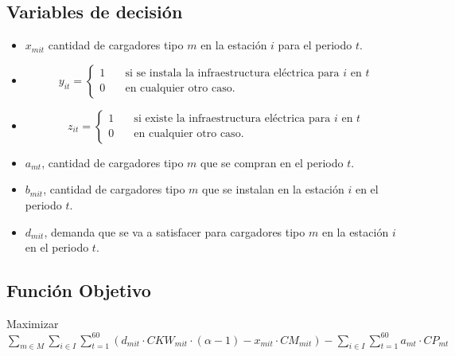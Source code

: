 \documentclass[letterpaper]{article}
\begin{document}
\begin{flushleft}
		\subsection{Variables de decisión} 
		\begin{itemize}
			\item $x_{mit}$ cantidad de cargadores tipo $m$ en la estación $i$ para el periodo $t$.
			\item \[
				y_{it} = 
					 \begin{cases}
					   1 &\quad\text{si se instala la infraestructura eléctrica para }i\text{ en }t\\
					   0 &\quad\text{en cualquier otro caso.}
					 \end{cases}
				\]
			\item \[
				z_{it} = 
						\begin{cases}
						1 &\quad\text{si existe la infraestructura eléctrica para }i\text{ en }t\\
						0 &\quad\text{en cualquier otro caso.}
						\end{cases}
				\]
			\item $a_{mt}$, cantidad de cargadores tipo $m$ que se compran en el periodo $t$.
			\item $b_{mit}$, cantidad de cargadores tipo $m$ que se instalan en la estación $i$ en el periodo $t$.
			\item $d_{mit}$, demanda que se va a satisfacer para cargadores tipo $m$ en la estación $i$ en el periodo $t$.
		\end{itemize}
		\subsection{Función Objetivo}
		\begin{center}
			Maximizar $\sum_{m \in M}\sum_{i \in I} \sum_{t=1}^{60} (d_{mit} \cdot CKW_{mit} \cdot (\alpha - 1) - x_{mit} \cdot CM_{mit}) - \sum_{i \in I} \sum_{t=1}^{60} a_{mt} \cdot CP_{mt}$
		\end{center}	
		

\end{flushleft}
\end{document}
